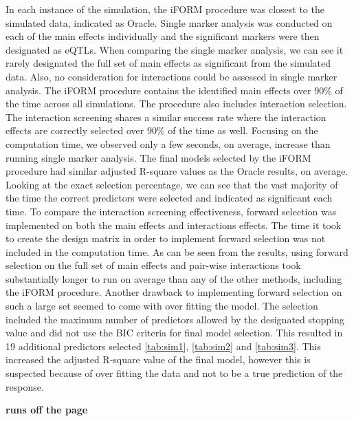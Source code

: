 \documentclass[11pt,]{book}
\theoremstyle{definition}
\theoremstyle{definition}
\theoremstyle{remark}
\begin{document}
In each instance of the simulation, the iFORM procedure was closest to
the simulated data, indicated as Oracle. Single marker analysis was
conducted on each of the main effects individually and the significant
markers were then designated as eQTLs. When comparing the single marker
analysis, we can see it rarely designated the full set of main effects
as significant from the simulated data. Also, no consideration for
interactions could be assessed in single marker analysis. The iFORM
procedure contains the identified main effects over 90\% of the time
across all simulations. The procedure also includes interaction
selection. The interaction screening shares a similar success rate where
the interaction effects are correctly selected over 90\% of the time as
well. Focusing on the computation time, we observed only a few seconds,
on average, increase than running single marker analysis. The final
models selected by the iFORM procedure had similar adjusted R-square
values as the Oracle results, on average. Looking at the exact selection
percentage, we can see that the vast majority of the time the correct
predictors were selected and indicated as significant each time. To
compare the interaction screening effectiveness, forward selection was
implemented on both the main effects and interactions effects. The time
it took to create the design matrix in order to implement forward
selection was not included in the computation time. As can be seen from
the results, using forward selection on the full set of main effects and
pair-wise interactions took substantially longer to run on average than
any of the other methods, including the iFORM procedure. Another
drawback to implementing forward selection on such a large set seemed to
come with over fitting the model. The selection included the maximum
number of predictors allowed by the designated stopping value and did
not use the BIC criteria for final model selection. This resulted in 19
additional predictors selected \ref{tab:sim1}, \ref{tab:sim2} and
\ref{tab:sim3}. This increased the adjusted R-square value of the final
model, however this is suspected because of over fitting the data and
not to be a true prediction of the response.

\textbf{runs off the page}
\end{document}
